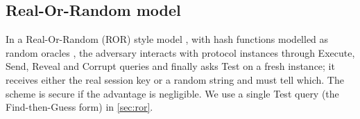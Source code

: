 \subsection{Real-Or-Random model}
In a Real-Or-Random (ROR) style model \citep{abdalla2005}, with hash functions modelled as random oracles
\citep{bellare1993}, the adversary interacts with protocol instances through
\textsf{Execute}, \textsf{Send}, \textsf{Reveal} and \textsf{Corrupt} queries and finally asks \textsf{Test} on a fresh
instance; it receives either the real session key or a random string and must tell which. The scheme is secure if the
advantage is negligible. We use a single \textsf{Test} query (the Find-then-Guess form) in \cref{sec:ror}.

